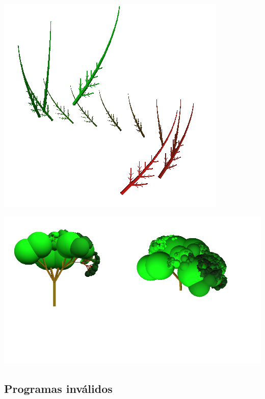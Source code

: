 \centerline{\includegraphics[scale=0.40]{../imagenes/eg26.png}}




\centerline{\includegraphics[scale=0.40]{../imagenes/eg27.png}}


\newpage

\subsection{Programas inv\'alidos}



